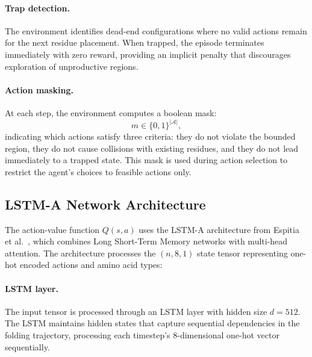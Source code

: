 \documentclass[12pt, oneside, openany]{book}
\theoremstyle{plain}
\theoremstyle{definition}
\begin{document}
\paragraph{Trap detection.} The environment identifies dead-end configurations where no valid actions remain for the next residue placement. When trapped, the episode terminates immediately with zero reward, providing an implicit penalty that discourages exploration of unproductive regions.

\paragraph{Action masking.} At each step, the environment computes a boolean mask:
\begin{equation}
m \in \{0,1\}^{|\mathcal{A}|},
\end{equation}
indicating which actions satisfy three criteria: they do not violate the bounded region, they do not cause collisions with existing residues, and they do not lead immediately to a trapped state. This mask is used during action selection to restrict the agent's choices to feasible actions only.

\subsection{LSTM-A Network Architecture}

The action-value function $Q(s,a)$ uses the LSTM-A architecture from Espitia et al.\ \cite{Espitia2024}, which combines Long Short-Term Memory networks with multi-head attention. The architecture processes the $(n, 8, 1)$ state tensor representing one-hot encoded actions and amino acid types:

\paragraph{LSTM layer.} The input tensor is processed through an LSTM layer with hidden size $d = 512$. The LSTM maintains hidden states that capture sequential dependencies in the folding trajectory, processing each timestep's 8-dimensional one-hot vector sequentially.
\end{document}
